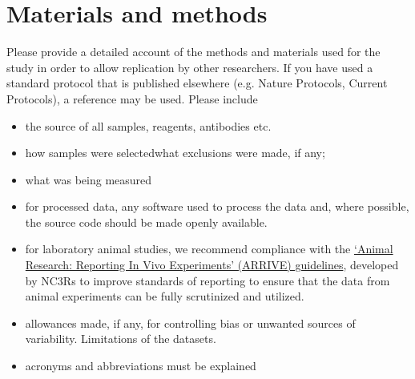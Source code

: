 \section*{Materials and methods}
Please provide a detailed account of the methods and materials used for the study in order to allow replication by other researchers.
If you have used a standard protocol that is published elsewhere (e.g. Nature Protocols, Current Protocols), a reference may be used. Please include \begin{itemize}
\item
the source of all samples, reagents, antibodies etc.
\item
 how samples were selectedwhat exclusions were made, if any;
\item
what was being measured
\item
for processed data, any software used to process the data and, where possible, the source code should be made openly available.\item

for laboratory animal studies, we recommend compliance with the \href{http://www.nc3rs.org.uk/downloaddoc.asp?id=1206&page=1357&skin=0}{`Animal Research: Reporting In Vivo Experiments' (ARRIVE) guidelines}, developed by NC3Rs to improve standards of reporting to ensure that the data from animal experiments can be fully scrutinized and utilized.\item

allowances made, if any, for controlling bias or unwanted sources of variability.
Limitations of the datasets.\item

acronyms and abbreviations must be explained
\end{itemize}
